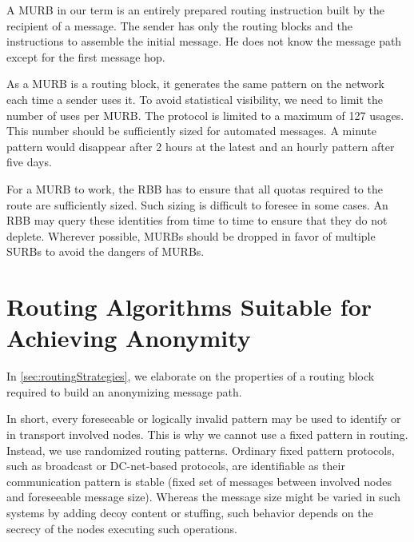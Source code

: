 A MURB in our term is an entirely prepared routing instruction built by the recipient of a message. The sender has only the routing blocks and the instructions to assemble the initial message. He does not know the message path except for the first message hop.

As a MURB is a routing block, it generates the same pattern on the network each time a sender uses it. To avoid statistical visibility, we need to limit the number of uses per MURB. The protocol is limited to a maximum of 127 usages. This number should be sufficiently sized for automated messages. A minute pattern would disappear after 2 hours at the latest and an hourly pattern after five days.

For a MURB to work, the RBB has to ensure that all quotas required to the route are sufficiently sized. Such sizing is difficult to foresee in some cases. An RBB may query these identities from time to time to ensure that they do not deplete. Wherever possible, MURBs should be dropped in favor of multiple SURBs to avoid the dangers of MURBs.

\section{Routing Algorithms Suitable for Achieving Anonymity\label{sec:routingAlgorithm}}
In \cref{sec:routingStrategies}, we elaborate on the properties of a routing block required to build an anonymizing message path.

In short, every foreseeable or logically invalid pattern may be used to identify \VortexMessages{} or in transport involved nodes. This is why we cannot use a fixed pattern in routing. Instead, we use randomized routing patterns. Ordinary fixed pattern protocols, such as broadcast or DC-net-based protocols, are identifiable as their communication pattern is stable (fixed set of messages between involved nodes and foreseeable message size). Whereas the message size might be varied in such systems by adding decoy content or stuffing, such behavior depends on the secrecy of the nodes executing such operations.

